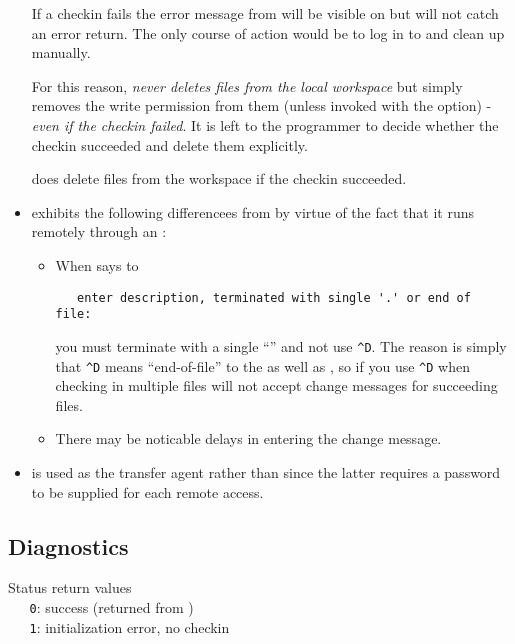 \begin{itemize}
   If a checkin fails the error message from  will be visible on
    but  will not catch an error return.  The only
   course of action would be to log in to  and clean up
   manually.

   For this reason,  \emph{never deletes files from the local
   workspace} but simply removes the write permission from them (unless
   invoked with the  option) - \emph{even if the checkin failed}.  It
   is left to the programmer to decide whether the checkin succeeded and
   delete them explicitly.

    does delete files from the  workspace if the
   checkin succeeded.

\item
    exhibits the following differencees from  by virtue
   of the fact that it runs  remotely through an :

   \begin{itemize}
   \item
      When  says to

\begin{verbatim}
   enter description, terminated with single '.' or end of file:
\end{verbatim}

      you must terminate with a single ``'' and not use \verb+^D+.
      The reason is simply that \verb+^D+ means ``end-of-file'' to the
       as well as , so if you use \verb+^D+ when
      checking in multiple files  will not accept change messages
      for succeeding files.

   \item
      There may be noticable delays in entering the change message.
   \end{itemize}

\item
    is used as the transfer agent rather than  since
   the latter requires a password to be supplied for each remote access. 
\end{itemize}

\subsection*{Diagnostics}
 
Status return values
\\ \verb+   0+:  success (returned from )
\\ \verb+   1+:  initialization error, no checkin\\
 
